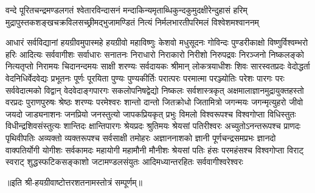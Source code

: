 
\fourlineindentedshloka
{वन्दे पूरितचन्द्रमण्डलगतं श्वेतारविन्दासनं}
{मन्दाकिन्यमृताब्धिकुन्दकुमुदक्षीरेन्दुहासं हरिम्}
{मुद्रापुस्तकशङ्खचक्रविलसच्छ्रीमद्भुजामण्डितं}
{नित्यं निर्मलभारतीपरिमलं विश्वेशमश्वाननम्}

{आधारं सर्वविद्यानां हयग्रीवमुपास्महे}
\twolineshloka
{हयग्रीवो महाविष्णुः केशवो मधुसूदनः}
{गोविन्दः पुण्डरीकाक्षो विष्णुर्विश्वम्भरो हरिः}
\twolineshloka
{आदित्यः सर्ववागीशः सर्वाधारः सनातनः}
{निराधारो निराकारो निरीशो निरुपद्रवः}
\twolineshloka
{निरञ्जनो  निष्कलङ्को नित्यतृप्तो निरामयः}
{चिदानन्दमयः साक्षी शरण्यः सर्वदायकः}
\twolineshloka
{श्रीमान् लोकत्रयाधीशः शिवः सारस्वतप्रदः}
{वेदोद्धर्ता वेदनिधिर्वेदवेद्यः प्रभूतनः}
\twolineshloka
{पूर्णः पूरयिता पुण्यः पुण्यकीर्तिः परात्परः}
{परमात्मा परञ्ज्योतिः परेशः पारगः परः}
\twolineshloka
{सर्ववेदात्मको विद्वान् वेदवेदाङ्गपारगः}
{सकलोपनिषद्वेद्यो निष्कलः सर्वशास्त्रकृत्}
\twolineshloka
{अक्षमालाज्ञानमुद्रायुक्तहस्तो वरप्रदः}
{पुराणपुरुषः श्रेष्ठः शरण्यः परमेश्वरः}
\twolineshloka
{शान्तो दान्तो जितक्रोधो जितामित्रो जगन्मयः}
{जगन्मृत्युहरो जीवो जयदो जाड्यनाशनः}
\twolineshloka
{जनप्रियो जनस्तुत्यो जापकप्रियकृत् प्रभुः}
{विमलो विश्वरूपश्च विश्वगोप्ता विधिस्तुतः}
\twolineshloka
{विधीन्द्रशिवसंस्तुत्यः शान्तिदः क्षान्तिपारगः}
{श्रेयप्रदः श्रुतिमयः श्रेयसां पतिरीश्वरः}
\twolineshloka
{अच्युतोऽनन्तरूपश्च प्राणदः पृथिवीपतिः}
{अव्यक्तो व्यक्तरूपश्च सर्वसाक्षी तमोहरः}
\twolineshloka
{अज्ञाननाशको ज्ञानी पूर्णचन्द्रसमप्रभः}
{ज्ञानदो वाक्पतिर्योगी योगीशः सर्वकामदः}
\twolineshloka
{महायोगी महामौनी मौनीशः श्रेयसां पतिः}
{हंसः परमहंसश्च विश्वगोप्ता विराट् स्वराट्}
\twolineshloka
{शुद्धस्फटिकसङ्काशो जटामण्डलसंयुतः}
{आदिमध्यान्तरहितः सर्ववागीश्वरेश्वरः}

॥इति श्री-हयग्रीवाष्टोत्तरशतनामस्तोत्रं सम्पूर्णम्॥
